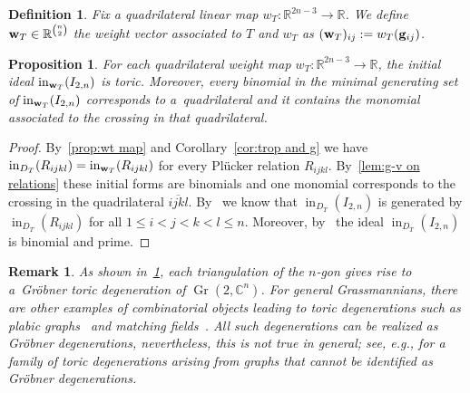 \documentclass[10pt,a4paper]{amsart}
\newcommand{\thlabel}[1]{\label{#1}}
\newcommand{\thref}[1]{\ref{#1}}
\newtheorem{Proposition}[Theorem]{Proposition}
\newtheorem{Definition}[Theorem]{Definition}
\newtheorem{Remark}[Theorem]{Remark}}
\numberwithin{equation}{section}
\DeclareMathOperator{\init}{in}
\DeclareMathOperator{\Gr}{Gr}
\begin{document}
\begin{Definition}\thlabel{def:wt of T}
Fix
a quadrilateral linear map $w_T\colon \mathbb R^{2n-3}\to \mathbb R$.
We define ${\bf w}_T\in\mathbb R^{\binom{n}{2}}$ the {\it weight vector associated to $T$ and $w_T$} as $({\bf w}_T)_{ij}:=w_T({\bf g}_{ij})$.
\end{Definition}

{\sloppy
\begin{Proposition}\thlabel{thm:toric wt ideals}
For each quadrilateral weight map $w_T\colon \mathbb R^{2n-3}\to \mathbb R$, the initial ideal $\init_{{\bf w}_T}(I_{2,n})$ is toric.
Moreover, every binomial in the minimal generating set of $\init_{{\bf w}_T}(I_{2,n})$ corresponds to a~quadrilateral and it contains the monomial associated to the crossing in that quadrilateral.
\end{Proposition}

}

\begin{proof}
By~\thref{prop:wt map} and Corollary~\ref{cor:trop and g} we have $\init_{{D_T}}(R_{ijkl}) = \init_{{\bf w}_T}(R_{ijkl})$ for every Pl\"ucker relation $R_{ijkl}$.
By~\thref{lem:g-v on relations} these initial forms are binomials and one monomial corresponds to the crossing in the quadrilateral $\overline{ijkl}$.
By~\cite[Proof of Theorem~3.4]{SS04} we know that $\init_{{D_T}}(I_{2,n})$ is generated by $\init_{{D_T}}(R_{ijkl})$ for all $1\le i<j<k<l\le n$.
Moreover, by~\cite[Corollary~4.4]{SS04} the ideal $\init_{{D_T}}(I_{2,n})$ is binomial and prime.
\end{proof}

\begin{Remark}\thlabel{rmk:toric degen}
As shown in~\thref{thm:toric wt ideals}, each triangulation of the $n$-gon gives rise to a~Gr\"obner toric degeneration of $\Gr(2,\mathbb C^n)$.
For general Grassmannians, there are other examples of combinatorial objects leading to toric degenerations such as
plabic graphs~\cite{BFFHL,RW17} and matching fields~\cite{clarke2021combinatorial,clarke2019toric, MoSh}.
All such degenerations can be realized as Gr\"obner degenerations, nevertheless, this is not true in general; see, e.g.,
\cite{kateri2015family} for a family of toric degenerations arising from graphs that cannot be identified as Gr\"obner degenerations.
\end{Remark}
\end{document}
